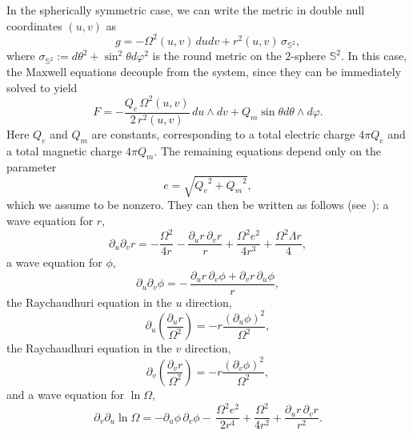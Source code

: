 \documentclass[a4paper,11pt,oneside,reqno]{amsart}
\begin{document}
In the spherically symmetric case, we can write the metric in double null coordinates $(u,v)$ as 
\[
g=-\Omega^2(u,v)\,dudv+r^2(u,v)\, \sigma_{\mathbb{S}^2}, 
\]
where $\sigma_{\mathbb{S}^2} := d\theta^2 + \sin^2 \theta d\varphi^2$ is the round metric on the $2$-sphere $\mathbb{S}^2$. In this case, the Maxwell equations decouple from the system, since they can be immediately solved to yield
\[
F = - \frac{Q_e \, \Omega^2(u,v)}{2 \, r^2(u,v)} \, du \wedge dv + Q_m \sin \theta d\theta \wedge d\varphi.
\]
Here $Q_e$ and $Q_m$ are constants, corresponding to a total electric charge $4 \pi Q_e$ and a total magnetic charge $4 \pi Q_m$. The remaining equations depend only on the parameter 
$$e = \sqrt{{Q_e}^2+{Q_m}^2},$$
which we assume to be nonzero. They can then be written as follows (see~\cite{relIst1}):
a wave equation for $r$,
\begin{equation}\label{wave_r} 
\partial_u\partial_vr=-\frac{\Omega^2}{4r} - \frac{\partial_ur\,\partial_vr}{r} + \frac{\Omega^2e^2}{4r^3} + \frac{\Omega^2 \Lambda r}{4},
\end{equation}
a wave equation for $\phi$,
\begin{equation}\label{wave_phi} 
\partial_u\partial_v\phi=-\,\frac{\partial_ur\,\partial_v\phi+\partial_vr\,\partial_u\phi}{r},
\end{equation}
the Raychaudhuri equation in the $u$ direction,
\begin{equation}\label{r_uu} 
\partial_u\left(\frac{\partial_ur}{\Omega^2}\right)=-r\frac{(\partial_u\phi)^2}{\Omega^2},
\end{equation}
the Raychaudhuri equation in the $v$ direction,
\begin{equation}\label{r_vv} 
\partial_v\left(\frac{\partial_vr}{\Omega^2}\right)=-r\frac{(\partial_v\phi)^2}{\Omega^2},
\end{equation}
and a wave equation for $\ln\Omega$,
 \begin{equation}\label{wave_Omega} 
\partial_v\partial_u\ln\Omega=-\partial_u\phi\,\partial_v\phi-\,\frac{\Omega^2e^2}{2r^4}+\frac{\Omega^2}{4r^2}+\frac{\partial_ur\,\partial_vr}{r^2}.
\end{equation}
\end{document}
